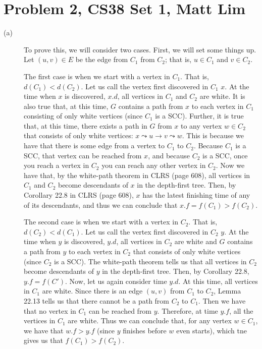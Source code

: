 \documentclass{article}
\begin{document}
\section*{Problem 2, CS38 Set 1, Matt Lim}
\begin{description}
    \item[(a)]
        To prove this, we will consider two cases. First, we will set some
        things up. Let $(u,v) \in E$ be the edge from $C_1$ from $C_2$; that is,
        $u \in C_1$ and $v \in C_2$.

        The first case is when we start with a vertex in $C_1$. That is,
        $d(C_1) < d(C_2)$. Let us call the vertex first discovered in $C_1$ $x$.
        At the time when $x$ is discovered, $x.d$, all vertices in $C_1$ and
        $C_2$ are white. It is also true that, at this time, $G$ contains a path
        from $x$ to each vertex in $C_1$ consisting of only white vertices
        (since $C_1$ is a SCC). Further, it is true that, at this time, there
        exists a path in $G$ from $x$ to any vertex $w \in C_2$ that consists of
        only white vertices: $x \leadsto u \rightarrow v \leadsto w$. This is
        because we have that there is some edge from a vertex to $C_1$ to $C_2$.
        Because $C_1$ is a SCC, that vertex can be reached from $x$, and because
        $C_2$ is a SCC, once you reach a vertex in $C_2$ you can reach any other
        vertex in $C_2$. Now we have that, by the white-path theorem in CLRS
        (page 608),
        all vertices in $C_1$ and $C_2$ become descendants of $x$ in the
        depth-first tree. Then, by Corollary 22.8 in CLRS (page 608), $x$ has the latest
        finishing time of any of its descendants, and thus we can conclude that
        $x.f = f(C_1) > f(C_2)$.

        The second case is when we start with a vertex in $C_2$. That is,
        $d(C_2) < d(C_1)$. Let us call the vertex first discovered in $C_2$ $y$.
        At the time when $y$ is discovered, $y.d$, all vertices in $C_2$ are
        white and $G$ contains a path from $y$ to each vertex in $C_2$ that
        consists of only white vertices (since $C_2$ is a SCC). The white-path
        theorem tells us that all vertices in $C_2$ become descendants of $y$
        in the depth-first tree. Then, by Corollary 22.8, $y.f = f(C')$. Now,
        let us again consider time $y.d$. At this time, all vertices in $C_1$
        are white. Since there is an edge $(u,v)$ from $C_1$ to $C_2$, Lemma
        22.13 tells us that there cannot be a path from $C_2$ to $C_1$. Then
        we have that no vertex in $C_1$ can be reached from $y$. Therefore, at
        time $y.f$, all the vertices in $C_1$ are white. Thus we can conclude
        that, for any vertex $w \in C_1$, we have that $w.f > y.f$ (since $y$
        finishes before $w$ even starts), which tne gives us that $f(C_1) >
        f(C_2)$.


\end{description}
\end{document}
